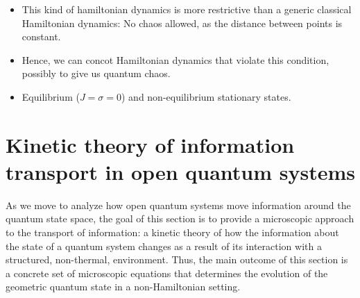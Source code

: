 \documentclass[draft,nofootinbib,pre,twocolumn,showpacs,showkeys,preprintnumbers,floatfix]{revtex4-1}
\newcommand{\1}{\mathbbm{1}}
\newcommand{\p}{\partial}
\begin{document}
\begin{itemize}
\item This kind of hamiltonian dynamics is more restrictive than a generic classical Hamiltonian dynamics: No chaos allowed, as the distance between points is constant.
\item Hence, we can concot Hamiltonian dynamics that violate this condition, possibly to give us quantum chaos.
\item Equilibrium ($J=\sigma=0$) and non-equilibrium stationary states.
\end{itemize}




\section{Kinetic theory of information transport in open quantum systems}
\label{sec:DYN}

As we move to analyze how open quantum systems move information around the
quantum state space, the goal of this section is to provide a microscopic approach
to the transport of information: a kinetic theory of how the information about the state
of a quantum system changes as a result of its interaction with a structured, non-thermal,
environment. Thus, the main outcome of this section is a concrete set of microscopic 
equations that determines the evolution of the geometric quantum state in a non-Hamiltonian 
setting.
\end{document}
